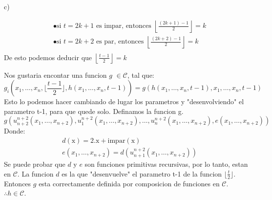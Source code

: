 \documentclass{report}
\begin{document}
\sol c)
\begin{myproof}
    \begin{align*}
        &\bullet \text{si } t = 2k + 1 \text{ es impar, entonces } \left\lfloor \frac{(2k+1)-1}{2} \right\rfloor = k \\
        &\bullet \text{si } t = 2k + 2 \text{ es par, entonces } \left\lfloor \frac{(2k+2)-1}{2} \right\rfloor = k \\
    \end{align*}De esto podemos deducir que $\left\lfloor \frac{t-1}{2} \right\rfloor = k$
\end{myproof}
\begin{myproof}
	Nos gustaria encontar una funcion $g$ $\in \mathcal{C}$, tal que: $$g_i(x_1,\ldots,x_n,\lfloor\frac{t-1}2\rfloor,h(x_1,\ldots,x_n,t-1))=g(h(x_1,\ldots,x_n,t-1),x_1,\ldots,x_n,t-1)$$
	Esto lo podemos hacer cambiando de lugar los parametros y "desenvolviendo" el parametro t-1, para que quede solo. Definamos la funcion g.
	$$g(u_{n+2}^{n+2}(x_1,\ldots,x_{n+2}),u_1^{n+2}(x_1,\ldots,x_{n+2}),\ldots,u_{n}^{n+2}(x_1,\ldots,x_{n+2}),e(x_1,\ldots,x_{n+2}))$$Donde:
	$$\begin{aligned}&d(\mathrm{x})=2.\mathrm{x}+\mathrm{impar}(\mathrm{x})\\&e(x_1,\ldots,x_{n+2})=d(u_{n+1}^{n+2}(x_1,\ldots,x_{n+2}))\end{aligned}$$Se puede probar que $d$ y $e$ son funciones primitivas recursivas, por lo tanto, estan en $\mathcal{C}$.
	La funcion $d$ es la que "desenvuelve" el parametro t-1 de la funcion $\lfloor\frac{t}2\rfloor$. Entonces $g$ esta correctamente definida por composicion de funciones en $\mathcal{C}$.
	$\therefore h \in \mathcal{C}$.
\end{myproof}
\end{document}
